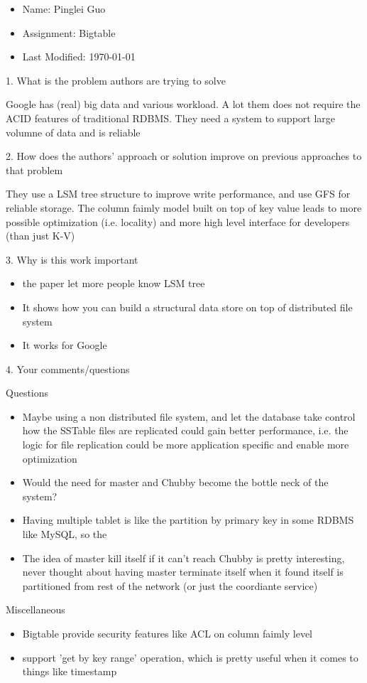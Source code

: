 \documentclass[12pt,a4paper,oneside]{article}
\begin{document}
\begin{itemize}
  \item Name: Pinglei Guo
  \item Assignment: Bigtable
  \item Last Modified: \today
\end{itemize}

1. What is the problem authors are trying to solve

\medskip

Google has (real) big data and various workload.
A lot them does not require the ACID features of traditional RDBMS.
They need a system to support large volumne of data and is reliable

\bigskip

2. How does the authors’ approach or solution improve on previous approaches to that problem

\medskip

They use a LSM tree structure to improve write performance, and use GFS for reliable storage.
The column faimly model built on top of key value leads to more possible optimization (i.e. locality)
and more high level interface for developers (than just K-V)

\bigskip

3. Why is this work important

\medskip

\begin{itemize}
  \item the paper let more people know LSM tree
  \item It shows how you can build a structural data store on top of distributed file system
  \item It works for Google
\end{itemize}

\bigskip

4. Your comments/questions

\medskip

Questions

\begin{itemize}
  \item Maybe using a non distributed file system, and let the database take control how the SSTable files
are replicated could gain better performance, i.e. the logic for file replication could be more application
specific and enable more optimization
  \item Would the need for master and Chubby become the bottle neck of the system?
  \item Having multiple tablet is like the partition by primary key in some RDBMS like MySQL, so the
  \item The idea of master kill itself if it can't reach Chubby is pretty interesting, never thought
  about having master terminate itself when it found itself is partitioned from rest of the network
  (or just the coordiante service)
\end{itemize}

Miscellaneous

\begin{itemize}
  \item Bigtable provide security features like ACL on column faimly level
  \item support 'get by key range' operation, which is pretty useful when it comes to things like timestamp
\end{itemize}
\end{document}
